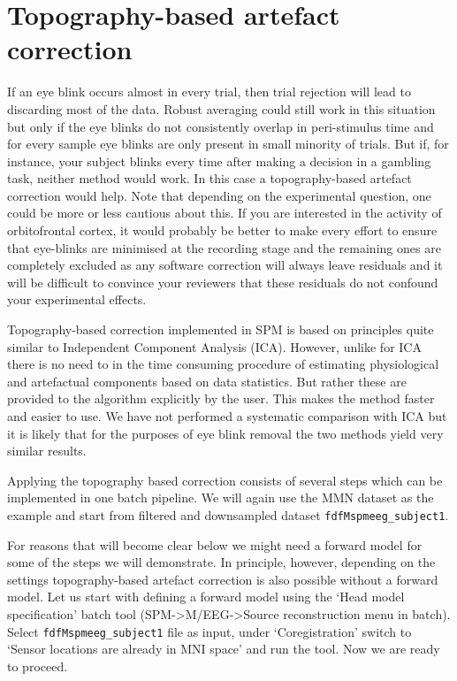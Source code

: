 \section{Topography-based artefact correction}

If an eye blink occurs almost in every trial, then trial rejection will lead to discarding most of the data. Robust averaging could still work in this situation but only if the eye blinks do not consistently overlap in peri-stimulus time and for every sample eye blinks are only present in small minority of trials. But if, for instance, your subject blinks every time after making a decision in a gambling task, neither method would work. In this case a topography-based artefact correction would help. Note that depending on the experimental question, one could be more or less cautious about this. If you are interested in the activity of orbitofrontal cortex, it would probably be better to make every effort to ensure that eye-blinks are minimised at the recording stage and the remaining ones are completely excluded as any software correction will always leave residuals and it will be difficult to convince your reviewers that these residuals do not confound your experimental effects.

Topography-based correction implemented in SPM is based on principles quite similar to Independent Component Analysis (ICA). However, unlike for ICA there is no need to in the time consuming procedure of estimating physiological and artefactual components based on data statistics. But rather these are provided to the algorithm explicitly by the user. This makes the method faster and easier to use. We have not performed a systematic comparison with ICA but it is likely that for the purposes of eye blink removal the two methods yield very similar results. 

Applying the topography based correction consists of several steps which can be implemented in one batch pipeline. We will again use the MMN dataset as the example and start from filtered and downsampled dataset \texttt{fdfMspmeeg\_subject1}. 

For reasons that will become clear below we might need a forward model for some of the steps we will demonstrate. In principle, however, depending on the settings topography-based artefact correction is also possible without a forward model. Let us start with defining a forward model using the `Head model specification' batch tool (SPM->M/EEG->Source reconstruction menu in batch). Select \texttt{fdfMspmeeg\_subject1} file as input, under `Coregistration' switch to `Sensor locations are already in MNI space' and run the tool. Now we are ready to proceed. 

